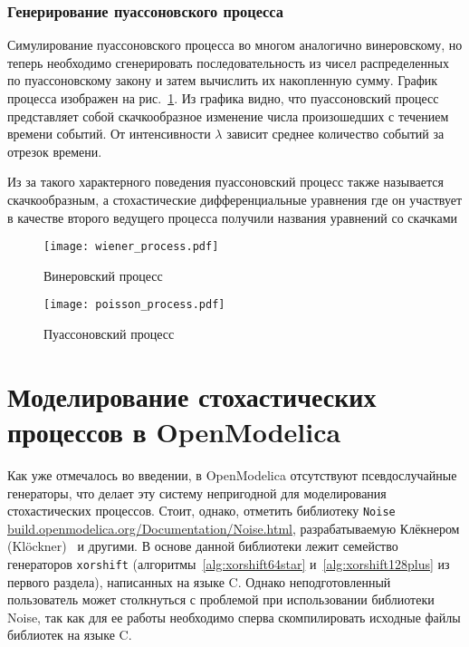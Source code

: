 \documentclass[%
floatfix,
showkeys,
nofootinbib, %
superscriptaddress, %
]{revtex4-1}
\begin{document}
\subsubsection{Генерирование пуассоновского процесса}

Симулирование пуассоновского процесса во многом аналогично
винеровскому, но теперь необходимо сгенерировать последовательность из
чисел распределенных по пуассоновскому закону и затем вычислить их
накопленную сумму. График процесса изображен на
рис.~\ref{fig:poissonprocess}. Из графика видно, что пуассоновский
процесс представляет собой скачкообразное изменение числа произошедших
с течением времени событий. От интенсивности $\lambda$ зависит среднее
количество событий за отрезок времени.

Из за такого характерного поведения пуассоновский процесс также
называется скачкообразным, а стохастические дифференциальные уравнения
где он участвует в качестве второго ведущего процесса получили
названия уравнений со скачками~\cite{L_Platen_Bruti}

\begin{figure}
  \centering
  \begin{minipage}[b]{0.48\linewidth}
    \texttt{[image: wiener\_process.pdf]}
    \caption{Винеровский процесс}
    \label{fig:wienerprocess}
  \end{minipage}
  \hfill
  \begin{minipage}[b]{0.48\linewidth}
    \texttt{[image: poisson\_process.pdf]}
    \caption{Пуассоновский процесс}
    \label{fig:poissonprocess}
  \end{minipage}
\end{figure}


\section{Моделирование стохастических процессов в OpenModelica}

Как уже отмечалось во введении, в OpenModelica отсутствуют
псевдослучайные генераторы, что делает эту систему непригодной для
моделирования стохастических процессов. Стоит, однако, отметить
библиотеку \texttt{Noise}
\url{build.openmodelica.org/Documentation/Noise.html}, разрабатываемую
Клёкнером (Klöckner)~\cite{L_Klockner:2014} и другими. В основе данной
библиотеки лежит семейство генераторов \texttt{xorshift}
(алгоритмы~\ref{alg:xorshift64star} и~\ref{alg:xorshift128plus} из
первого раздела), написанных на языке C. Однако неподготовленный
пользователь может столкнуться с проблемой при использовании
библиотеки Noise, так как для ее работы необходимо сперва
скомпилировать исходные файлы библиотек на языке C.
\end{document}

